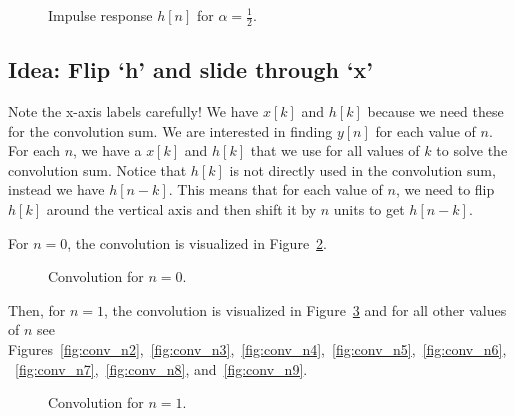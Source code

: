 \documentclass{ee102_notes}
\begin{document}
\begin{figure}[h]
    \centering
   
    \label{fig:hn}
    \caption{Impulse response $h[n]$ for $\alpha=\tfrac12$.}
\end{figure}
\subsection{Idea: Flip `h' and slide through `x'}
Note the x-axis labels carefully! We have $x[k]$ and $h[k]$ because we need these for the convolution sum. We are interested in finding $y[n]$ for each value of $n$. For each $n$, we have a $x[k]$ and $h[k]$ that we use for all values of $k$ to solve the convolution sum. Notice that $h[k]$ is not directly used in the convolution sum, instead we have $h[n-k]$. This means that for each value of $n$, we need to flip $h[k]$ around the vertical axis and then shift it by $n$ units to get $h[n-k]$.

For $n=0$, the convolution is visualized in Figure~\ref{fig:conv_n0}. 
\begin{figure}[h]
    \centering
    \caption{Convolution for $n=0$.}
    \label{fig:conv_n0}
\end{figure}


Then, for $n=1$, the convolution is visualized in Figure~\ref{fig:conv_n1} and for all other values of $n$ see Figures~\ref{fig:conv_n2},~\ref{fig:conv_n3},~\ref{fig:conv_n4},~\ref{fig:conv_n5},~\ref{fig:conv_n6},~\ref{fig:conv_n7},~\ref{fig:conv_n8}, and~\ref{fig:conv_n9}.

\begin{figure}[h]
    \centering
    \caption{Convolution for $n=1$.}
    \label{fig:conv_n1}
\end{figure}
\end{document}
